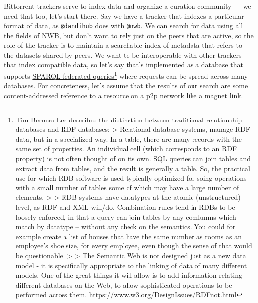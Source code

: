 \documentclass[notoc]{tufte-book}
\begin{document}
Bittorrent trackers serve to index data and organize a curation
community --- we need that too, let's start there. Say we have a tracker
that indexes a particular format of data, as
\href{https://hub.dandiarchive.org}{\texttt{@dandihub}} does with
\texttt{@nwb}. We can search for data using all the fields of NWB, but
don't want to rely just on the peers that are active, so the role of the
tracker is to maintain a searchable index of metadata that refers to the
datasets shared by peers. We want to be interoperable with other
trackers that index compatible data, so let's say that's implemented as
a database that supports
\href{https://www.w3.org/TR/sparql11-federated-query/}{SPARQL federated
queries}\footnote{Tim Berners-Lee describes the distinction between
  traditional relationship databases and RDF databases: \textgreater{}
  Relational database systems, manage RDF data, but in a specialized
  way. In a table, there are many records with the same set of
  properties. An individual cell (which corresponds to an RDF property)
  is not often thought of on its own. SQL queries can join tables and
  extract data from tables, and the result is generally a table. So, the
  practical use for which RDB software is used typically optimized for
  soing operations with a small number of tables some of which may have
  a large number of elements. \textgreater{} \textgreater{} RDB systems
  have datatypes at the atomic (unstructured) level, as RDF and XML
  will/do. Combination rules tend in RDBs to be loosely enforced, in
  that a query can join tables by any comlumns which match by datatype
  -- without any check on the semantics. You could for example create a
  list of houses that have the same number as rooms as an employee's
  shoe size, for every employee, even though the sense of that would be
  questionable. \textgreater{} \textgreater{} The Semantic Web is not
  designed just as a new data model - it is specifically appropriate to
  the linking of data of many different models. One of the great things
  it will allow is to add information relating different databases on
  the Web, to allow sophisticated operations to be performed across
  them. https://www.w3.org/DesignIssues/RDFnot.html} where requests can
be spread across many databases. For concreteness, let's assume that the
results of our search are some content-addressed reference to a resource
on a p2p network like a
\href{https://en.wikipedia.org/wiki/Magnet_URI_scheme}{magnet link}.
\end{document}
